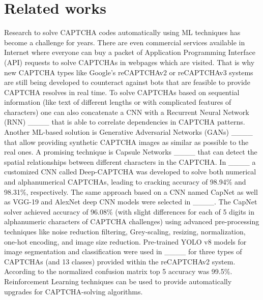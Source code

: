 \section{Related works}
Research to solve CAPTCHA codes automatically using ML techniques has become a challenge for years. There are even commercial services available in Internet where everyone can buy a packet of Application Programming Interface (API) requests to solve CAPTCHAs in webpages which are visited. That is why new CAPTCHA types like Google’s reCAPTCHAv2 or reCAPTCHAv3 systems are still being developed to counteract against bots that are feasible to provide CAPTCHA resolves in real time. To solve CAPTCHAs based on sequential information (like text of different lengths or with complicated features of characters) one can also concatenate a CNN with a Recurrent Neural Network (RNN) ____ that is able to correlate dependencies in CAPTCHA patterns. Another ML-based solution is Generative Adversarial Networks (GANs) ____ that allow providing synthetic CAPTCHA images as similar as possible to the real ones. A promising technique is Capsule Networks ____ that can detect the spatial relationships between different characters in the CAPTCHA. In ____ a customized CNN called Deep-CAPTCHA was developed to solve both numerical and alphanumerical CAPTCHAs, leading to cracking accuracy of 98.94\% and 98.31\%, respectively. The same approach based on a CNN named CapNet as well as VGG-19 and AlexNet deep CNN models were selected in ____. The CapNet solver achieved accuracy of 96.08\% (with slight differences for each of 5 digits in alphanumeric characters of CAPTCHA challenges) using advanced pre-processing techniques like noise reduction filtering, Grey-scaling, resizing, normalization, one-hot encoding, and image size reduction. Pre-trained YOLO v8 models for image segmentation and classification were used in ____ for three types of CAPTCHAs (and 13 classes) provided within the reCAPTCHAv2 system. According to the normalized confusion matrix top 5 accuracy was 99.5\%. Reinforcement Learning techniques can be used to provide automatically upgrades for CAPTCHA-solving algorithms.